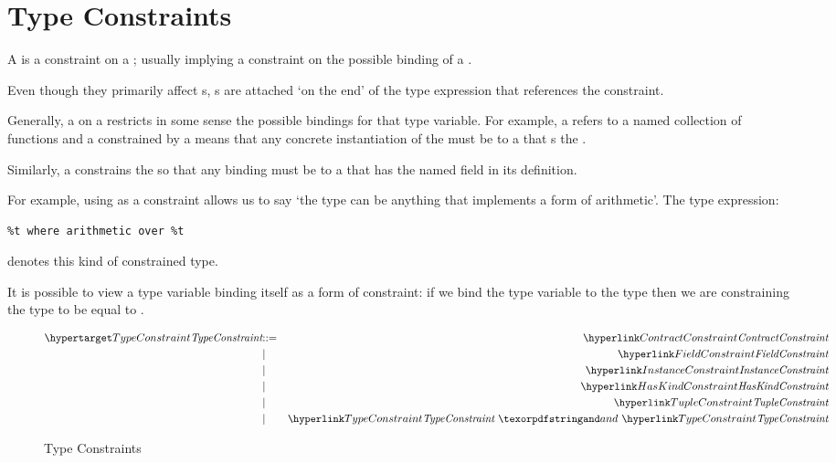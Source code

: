 \section{Type Constraints}
\label{typeConstraints}

A  is a constraint on a ; usually implying a constraint on the possible binding of a . 
\begin{aside}
Even though they primarily affect s, s are attached `on the end' of the type expression that references the constraint.
\end{aside}
Generally, a  on a  restricts in some sense the possible bindings for that type variable. For example, a  refers to a named collection of functions and a  constrained by a  means that any concrete instantiation of the  must be to a  that s the .

Similarly, a  constrains the  so that any binding must be to a  that has the named field in its definition.

For example, using  as a constraint allows us to say `the type can be anything that implements a form of arithmetic'. The type expression:
\begin{lstlisting}
%t where arithmetic over %t
\end{lstlisting}
denotes this kind of constrained type.

\begin{aside}
\begin{aside}
It is possible to view a type variable binding itself as a form of constraint: if we bind the type variable  to the type  then we are constraining the type  to be equal to .
\end{aside}\end{aside}

\begin{figure}[htbp]
\begin{eqnarray*}
\ntDef{TypeConstraint}&\arrow&\ntRef{ContractConstraint}\\
&\choice&\ntRef{FieldConstraint}\\
&\choice&\ntRef{InstanceConstraint}\\
&\choice&\ntRef{HasKindConstraint}\\
&\choice&\ntRef{TupleConstraint}\\
&\choice&\ntRef{TypeConstraint}\ \q{and}\ \ntRef{TypeConstraint}
\end{eqnarray*}
\caption{Type Constraints}
\label{typeConstraintFig}
\end{figure}

